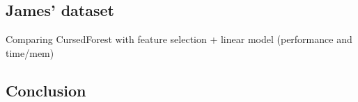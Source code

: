 \documentclass[10pt,letterpaper]{article}
\begin{document}






\subsection*{James' dataset}
Comparing CursedForest with feature selection + linear model (performance and time/mem) 



\subsection*{Conclusion}



\end{document}
